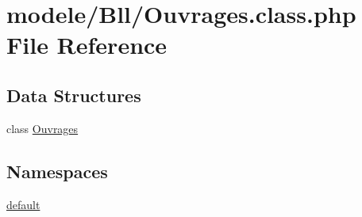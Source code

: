 \hypertarget{_ouvrages_8class_8php}{}\section{modele/\+Bll/\+Ouvrages.class.\+php File Reference}
\label{_ouvrages_8class_8php}
\subsection*{Data Structures}
\begin{DoxyCompactItemize}
\item 
class \hyperlink{class_ouvrages}{Ouvrages}
\end{DoxyCompactItemize}
\subsection*{Namespaces}
\begin{DoxyCompactItemize}
\item 
 \hyperlink{namespacedefault}{default}
\end{DoxyCompactItemize}
